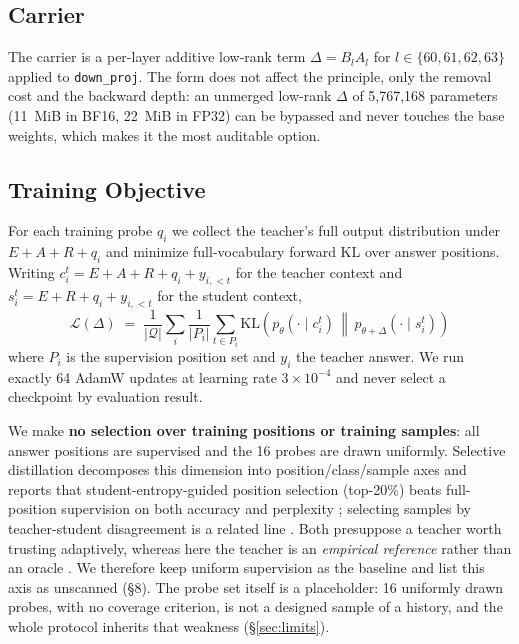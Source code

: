 \documentclass[sigconf,nonacm]{acmart}
\newcommand{\KL}{\mathrm{KL}}
\begin{document}
\subsection{Carrier}

The carrier is a per-layer additive low-rank term $\Delta=B_lA_l$ for $l\in\{60,61,62,63\}$ applied to
\texttt{down\_proj}. The form does not affect the principle, only the removal cost and the backward depth:
an unmerged low-rank $\Delta$ of 5,767,168 parameters (11~MiB in BF16, 22~MiB in FP32) can be bypassed and
never touches the base weights, which
makes it the most auditable option.

\subsection{Training Objective}

For each training probe $q_i$ we collect the teacher's full output distribution under $E{+}A{+}R{+}q_i$
and minimize full-vocabulary forward KL over answer positions. Writing $c_i^t = E{+}A{+}R{+}q_i{+}y_{i,<t}$
for the teacher context and $s_i^t = E{+}R{+}q_i{+}y_{i,<t}$ for the student context,
\begin{equation}
\mathcal{L}(\Delta) \;=\; \frac{1}{|\mathcal{Q}|}\sum_{i}\frac{1}{|P_i|}\sum_{t\in P_i}
\KL\!\left( p_\theta(\cdot\mid c_i^t) \,\middle\|\, p_{\theta+\Delta}(\cdot\mid s_i^t) \right)
\label{eq:obj}
\end{equation}
where $P_i$ is the supervision position set and $y_i$ the teacher answer. We run exactly 64 AdamW updates
at learning rate $3\times10^{-4}$ and never select a checkpoint by evaluation result.

We make \textbf{no selection over training positions or training samples}: all answer positions are
supervised and the 16 probes are drawn uniformly. Selective distillation decomposes this dimension into
position/class/sample axes and reports that student-entropy-guided position selection (top-20\%) beats
full-position supervision on both accuracy and perplexity \cite{tavor2026,selectkd2026}; selecting samples
by teacher-student disagreement is a related line \cite{maxdiv2026}. Both presuppose a teacher worth
trusting adaptively, whereas here the teacher is an \emph{empirical reference} rather than an oracle
\cite{adaptivekd2025}. We therefore keep uniform supervision as the baseline and list this axis as
unscanned (\S8). The probe set itself is a placeholder: 16 uniformly drawn probes, with no coverage criterion,
is not a designed sample of a history, and the whole protocol inherits that weakness (\S\ref{sec:limits}).
\end{document}
